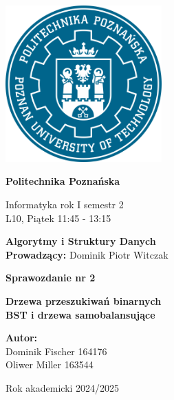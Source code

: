 \documentclass{article}
\begin{document}
	\begin{center}
		\includegraphics[width=6cm]{Image/PP-PUT-LOGO.png}
		\vspace{1cm}
		
		{\Huge\bfseries Politechnika Poznańska}
		
		\vspace{1cm}
		
		{\large Informatyka rok I semestr 2} \\[0.3cm]
		L10, Piątek 11:45 - 13:15
		
		\vspace{1.5cm}
		
		{\LARGE\bfseries Algorytmy i Struktury Danych} \\[0.3cm]
		\textbf{Prowadzący:} Dominik Piotr Witczak
		
		\vspace{2cm}
		
		{\LARGE\bfseries Sprawozdanie nr 2} 
		
		\vspace{1cm}
		
		{\Large\bfseries Drzewa przeszukiwań binarnych \\
			BST i drzewa samobalansujące}
		
		\vspace{3cm}
		
		\begin{flushright}
			\textbf{Autor:} \\[0.2cm]
			Dominik Fischer 164176 \\
			Oliwer Miller 163544
		\end{flushright}
		
		\vspace{1.5cm}
		Rok akademicki 2024/2025
	\end{center}
	
	
	
	\newpage
	
\end{document}
